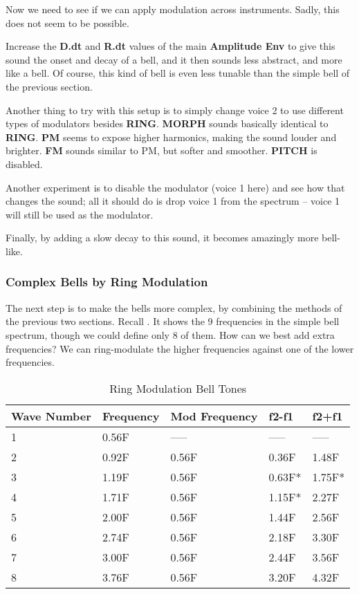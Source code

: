    Now we need to see if we can apply modulation across instruments.
   Sadly, this does not seem to be possible.

   Increase the \textbf{D.dt} and \textbf{R.dt} values of the main
   \textbf{Amplitude Env} to give this sound the onset and decay of a bell,
   and it then sounds less abstract, and more like a bell.
   Of course, this kind of bell is even less tunable than the simple
   bell of the previous section.

   Another thing to try with this setup is to simply change voice 2 to use
   different types of modulators besides \textbf{RING}.
   \textbf{MORPH} sounds basically identical to \textbf{RING}.
   \textbf{PM} seems to expose higher harmonics, making the sound louder and
   brighter.
   \textbf{FM} sounds similar to PM, but softer and smoother.
   \textbf{PITCH} is disabled.

   Another experiment is to disable the modulator (voice 1 here) and see how
   that changes the sound; all it should do is drop voice 1 from the
   spectrum -- voice 1 will still be used as the modulator.

   Finally, by adding a slow decay to this sound, it becomes amazingly more
   bell-like.

\subsubsection{Complex Bells by Ring Modulation}
\label{subsec:cookbook_instruments_bells_by_ring_mod}

   The next step is to make the bells more complex, by combining the methods
   of the previous two sections.
   Recall .
   It shows the 9 frequencies in the simple bell spectrum, though we could
   define only 8 of them.  How can we best add extra frequencies?
   We can ring-modulate the higher frequencies against one of the lower
   frequencies.

\label{table:ring_mod_bell_tones}
\begin{longtable}{l l l l l}
   \caption{Ring Modulation Bell Tones} \\
   \hline
      \textbf{Wave Number} &
      \textbf{Frequency} &
      \textbf{Mod Frequency} &
      \textbf{f2-f1} &
      \textbf{f2+f1} \\
   \hline
   \endfirsthead

   1 &  0.56F &  ----- &  -----   &  -----   \\
   2 &  0.92F &  0.56F &  0.36F   &  1.48F   \\
   3 &  1.19F &  0.56F &  0.63F*  &  1.75F*  \\
   4 &  1.71F &  0.56F &  1.15F*  &  2.27F   \\
   5 &  2.00F &  0.56F &  1.44F   &  2.56F   \\
   6 &  2.74F &  0.56F &  2.18F   &  3.30F   \\
   7 &  3.00F &  0.56F &  2.44F   &  3.56F   \\
   8 &  3.76F &  0.56F &  3.20F   &  4.32F   \\
\end{longtable}


